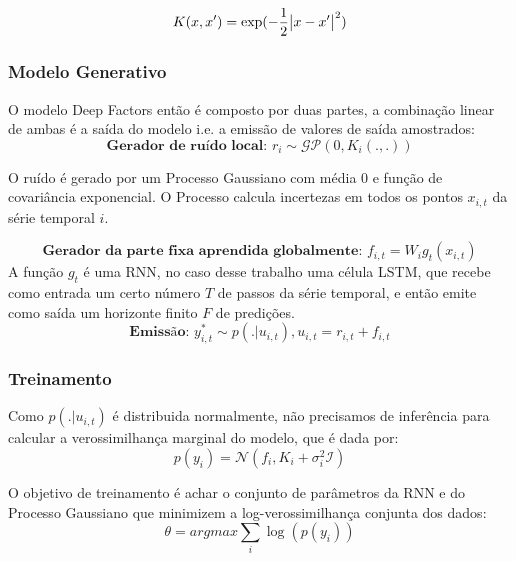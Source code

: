 \[
  K(x,x') = \exp(-\frac{1}{2}\abs{x - x'}^2)
\]


\subsubsection{Modelo Generativo}

O modelo Deep Factors então é composto por duas partes, a combinação linear de ambas é a saída do modelo i.e. a emissão de valores de saída amostrados: \\


\[
    \textbf{Gerador de ruído local: }  r_i \sim \mathcal{GP} (0, K_i(.,.))
\]

O ruído é gerado por um Processo Gaussiano com média 0 e função de covariância exponencial. O Processo calcula incertezas em todos os pontos $x_{i,t}$ da série temporal $i$.
  
\[
  \textbf{Gerador da parte fixa aprendida globalmente: }  f_{i,t} = W_ig_t(x_{i,t})
\]
A função $g_t$ é uma RNN, no caso desse trabalho uma célula LSTM, que recebe como entrada um certo número $T$ de passos da série temporal, e então emite como saída um horizonte finito $F$ de predições.
\[
  \textbf{Emissão: }  y^*_{i,t} \sim p(. | u_{i,t}) , u_{i,t} = r_{i,t} + f_{i,t}  
\]

\subsubsection{Treinamento}

Como $p(. | u_{i,t})$ é distribuida normalmente, não precisamos de inferência para calcular a verossimilhança marginal do modelo, que é dada por: \\

\[
p(y_{i}) = \mathcal{N}(f_i,K_i + \sigma_i^2\mathcal{I})
\]

O objetivo de treinamento é achar o conjunto de parâmetros da RNN e do Processo Gaussiano que minimizem a log-verossimilhança conjunta dos dados: \\
\[
\theta = argmax \sum_i{\log(p(y_i))}
\]


